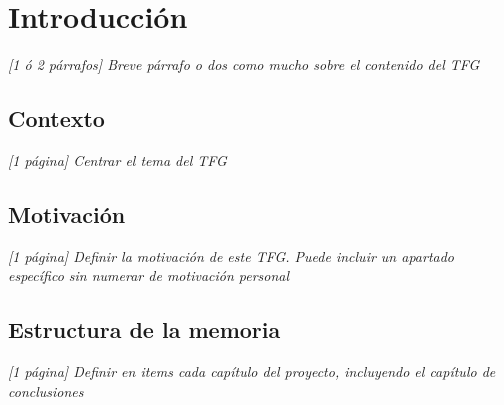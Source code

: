 \chapter{Introducción}
\label{sec:intro}

\textit{[1 ó 2 párrafos] Breve párrafo o dos como mucho sobre el contenido del TFG}

\section{Contexto}
\label{sec:contexto}

\textit{[1 página] Centrar el tema del TFG}

\section{Motivación}
\label{sec:motivación}

\textit{[1 página] Definir la motivación de este TFG. Puede incluir un apartado específico sin numerar de motivación personal}

\section{Estructura de la memoria}
\label{sec:estructura}

\textit{[1 página] Definir en items cada capítulo del proyecto, incluyendo el capítulo de conclusiones}